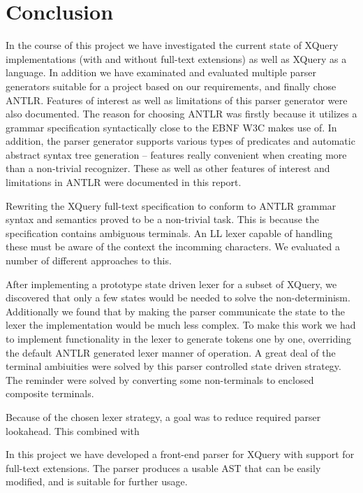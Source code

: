 \chapter{Conclusion}
\label{chapter:conclusion}

In the course of this project we have investigated the current state of XQuery implementations (with and without full-text extensions) as well as XQuery as a language. In addition we have examinated and evaluated multiple parser generators suitable for a project based on our requirements, and finally chose ANTLR. Features of interest as well as limitations of this parser generator were also documented.
The reason for choosing ANTLR was firstly because it utilizes a grammar specification syntactically close to the EBNF W3C makes use of. In addition, the parser generator supports various types of predicates and automatic abstract syntax tree generation -- features really convenient when creating more than a non-trivial recognizer. These as well as other features of interest and limitations in ANTLR were documented in this report.

Rewriting the XQuery full-text specification to conform to ANTLR grammar syntax and semantics proved to be a non-trivial task. This is because the specification contains ambiguous terminals. An LL lexer capable of handling these must be aware of the context the incomming characters. We evaluated a number of different approaches to this. 

After implementing a prototype state driven lexer for a subset of XQuery, we discovered that only a few states would be needed to solve the non-determinism. Additionally we found that by making the parser communicate the state to the lexer the implementation would be much less complex. To make this work we had to implement functionality in the lexer to generate tokens one by one, overriding the default ANTLR generated lexer manner of operation. A great deal of the terminal ambiuities were solved by this parser controlled state driven strategy. The reminder were solved by converting some non-terminals to enclosed composite terminals.

Because of the chosen lexer strategy, a goal was to reduce required parser lookahead. This combined with

In this project we have developed a front-end parser for XQuery with support for full-text extensions. The parser produces a usable AST that can be easily modified, and is suitable for further usage.




